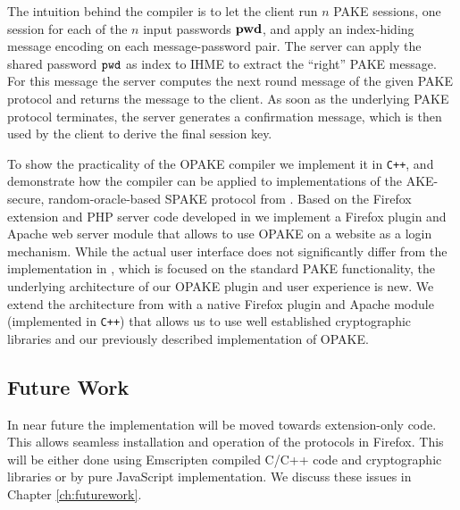 The intuition behind the compiler is to let the client run $n$ \ac{PAKE} sessions, one session for each of the $n$ input passwords $\mathtt{{\bf pwd}}$, and apply an index-hiding message encoding on each message-password pair.
The server can apply the shared password $\mathtt{pwd}$ as index to \ac{IHME} to extract the ``right'' \ac{PAKE} message. 
For this message the server computes the next round message of the given \ac{PAKE} protocol and returns the message to the client.
As soon as the underlying \ac{PAKE} protocol terminates, the server generates a confirmation message, which is then used by the client to derive the final session key.

To show the practicality of the \ac{OPAKE} compiler we implement it in \verb/C++/, and demonstrate how the compiler can be applied to implementations of the \ac{AKE}-secure, random-oracle-based SPAKE protocol from \cite{Abdalla2005}.
Based on the Firefox extension and PHP server code developed in \cite{MSD13} we implement a Firefox plugin and Apache web server module that allows to use \ac{OPAKE} on a website as a login mechanism.
While the actual user interface does not significantly differ from the implementation in \cite{MSD13}, which is focused on the standard PAKE functionality, the underlying architecture of our \ac{OPAKE} plugin and user experience is new.
We extend the architecture from \cite{MSD13} with a native Firefox plugin and Apache module (implemented in \texttt{C++}) that allows us to use well established cryptographic libraries and our previously described implementation of \ac{OPAKE}.

\subsection{Future Work}
In near future the implementation will be moved towards extension-only code.
This allows seamless installation and operation of the protocols in Firefox.
This will be either done using Emscripten compiled C/C++ code and cryptographic libraries or by pure JavaScript implementation.
We discuss these issues in Chapter \ref{ch:futurework}.
